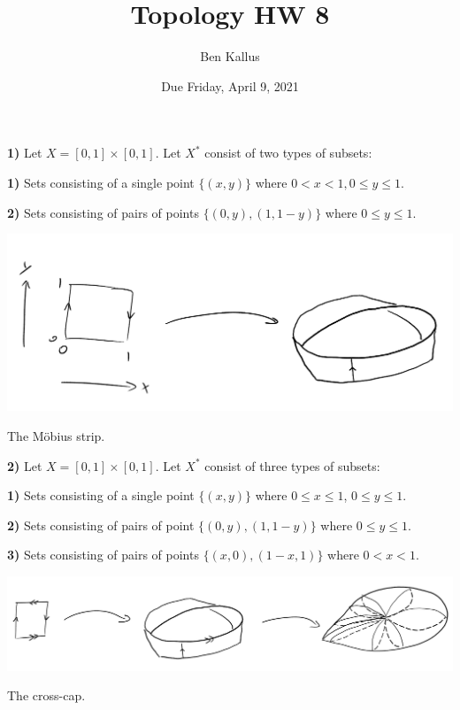 \documentclass[12pt]{report}
\title{Topology HW 8}
\author{Ben Kallus}
\date{Due Friday, April 9, 2021}
\begin{document}
\maketitle

\newpage\noindent\textbf{1)} Let $X = [0,1] \times [0,1]$. Let $X^*$ consist of two types of subsets:

\medskip\textbf{1)} Sets consisting of a single point $\{(x,y)\}$ where $0 < x < 1, 0 \leq y \leq 1.$

\medskip\textbf{2)} Sets consisting of pairs of points $\{(0,y), (1,1-y)\}$ where $0 \leq y \leq 1.$

\begin{center}\includegraphics[scale=.5]{pic1.png}

The M\"obius strip.\end{center}

\newpage\noindent\textbf{2)} Let $X=[0,1] \times[0,1].$ Let $X^*$ consist of three types of subsets:

\medskip\textbf{1)} Sets consisting of a single point $\{(x,y)\}$ where $0 \leq x \leq 1$, $0 \leq y \leq 1$.

\medskip\textbf{2)} Sets consisting of pairs of point $\{(0,y),(1,1-y)\}$ where $0 \leq y \leq 1$.

\medskip\textbf{3)} Sets consisting of pairs of points $\{(x,0),(1-x,1)\}$ where $0 < x < 1$.

\begin{center}\includegraphics[scale=.4]{pic2.png}

The cross-cap.\end{center}
\end{document}
